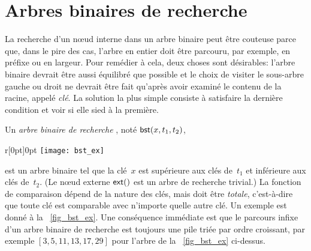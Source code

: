 \chapter{Arbres binaires de recherche}

La recherche d'un n{\oe}ud interne dans un arbre binaire peut être
couteuse parce que, dans le pire des cas, l'arbre en entier doit être
parcouru, par exemple, en préfixe ou en largeur. Pour remédier à cela,
deux choses sont désirables: l'arbre binaire devrait être aussi
équilibré que possible et le
choix de visiter le sous-arbre gauche ou droit ne devrait être fait
qu'après avoir examiné le contenu de la racine, appelé
\emph{clé}. La solution la plus simple consiste à
satisfaire la dernière condition et voir si elle sied à la première.

Un \emph{arbre binaire de recherche} \citep{Mahmoud_1992}, noté \(\textsf{bst}(x, t_1,
t_2)\),
\begin{wrapfigure}[7]{r}[0pt]{0pt}
\centering
\texttt{[image: bst\_ex]}
\caption{\label{fig_bst_ex}}
\end{wrapfigure}
est un arbre binaire tel que la clé~\(x\) est supérieure aux clés
de~\(t_1\) et inférieure aux clés de~\(t_2\). (Le n{\oe}ud externe
\(\textsf{ext}()\) est un arbre de recherche trivial.) La fonction de
comparaison dépend de la nature des clés, mais doit être
\emph{totale}, c'est-à-dire que toute clé est comparable avec
n'importe quelle autre clé. Un exemple est donné à la
\fig~\vref{fig_bst_ex}. Une conséquence immédiate est que le parcours
infixe d'un arbre binaire de
recherche est toujours une pile triée par ordre croissant, par exemple
\([3,5,11,13,17,29]\) pour l'arbre de la \fig~\ref{fig_bst_ex}
ci-dessus.

